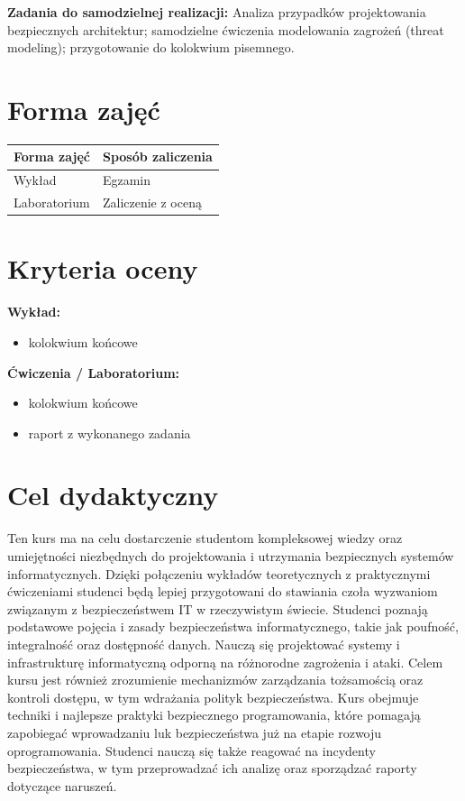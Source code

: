 \documentclass[12pt, a4paper]{article}
\newcommand{\thdrule}{\noalign{\global\setlength{\extrarowheight}{0pt}}}
\newcommand{\thdend}{\noalign{\global\setlength{\extrarowheight}{3pt}}}
\begin{document}
\vspace{4pt}
\noindent\textbf{Zadania do samodzielnej realizacji:} Analiza przypadków projektowania bezpiecznych architektur; samodzielne ćwiczenia modelowania zagrożeń (threat modeling); przygotowanie do kolokwium pisemnego.

\section{Forma zajęć}

\begin{center}
{\scriptsize
\begin{tabular}{m{5cm}m{8cm}}
\thdrule\toprule
\rowcolor{pjatkRed} {\color{white}\textbf{Forma zajęć}} & {\color{white}\textbf{Sposób zaliczenia}} \\
\midrule\thdend
  \rowcolor{tableRowLight} Wykład & Egzamin \\
  \rowcolor{tableRowAlt} Laboratorium & Zaliczenie z oceną \\
\bottomrule
\end{tabular}}
\end{center}

\section{Kryteria oceny}

\textbf{Wykład:}
\begin{itemize}
  \item kolokwium końcowe
\end{itemize}
\vspace{4pt}
\textbf{Ćwiczenia / Laboratorium:}
\begin{itemize}
  \item kolokwium końcowe
  \item raport z wykonanego zadania
\end{itemize}


\section{Cel dydaktyczny}

Ten kurs ma na celu dostarczenie studentom kompleksowej wiedzy oraz umiejętności niezbędnych do projektowania i utrzymania bezpiecznych systemów informatycznych. Dzięki połączeniu wykładów teoretycznych z praktycznymi ćwiczeniami studenci będą lepiej przygotowani do stawiania czoła wyzwaniom związanym z bezpieczeństwem IT w rzeczywistym świecie.  Studenci poznają podstawowe pojęcia i zasady bezpieczeństwa informatycznego, takie jak poufność, integralność oraz dostępność danych. Nauczą się projektować systemy i infrastrukturę informatyczną odporną na różnorodne zagrożenia i ataki. Celem kursu jest również zrozumienie mechanizmów zarządzania tożsamością oraz kontroli dostępu, w tym wdrażania polityk bezpieczeństwa.  Kurs obejmuje techniki i najlepsze praktyki bezpiecznego programowania, które pomagają zapobiegać wprowadzaniu luk bezpieczeństwa już na etapie rozwoju oprogramowania. Studenci nauczą się także reagować na incydenty bezpieczeństwa, w tym przeprowadzać ich analizę oraz sporządzać raporty dotyczące naruszeń.
\end{document}
